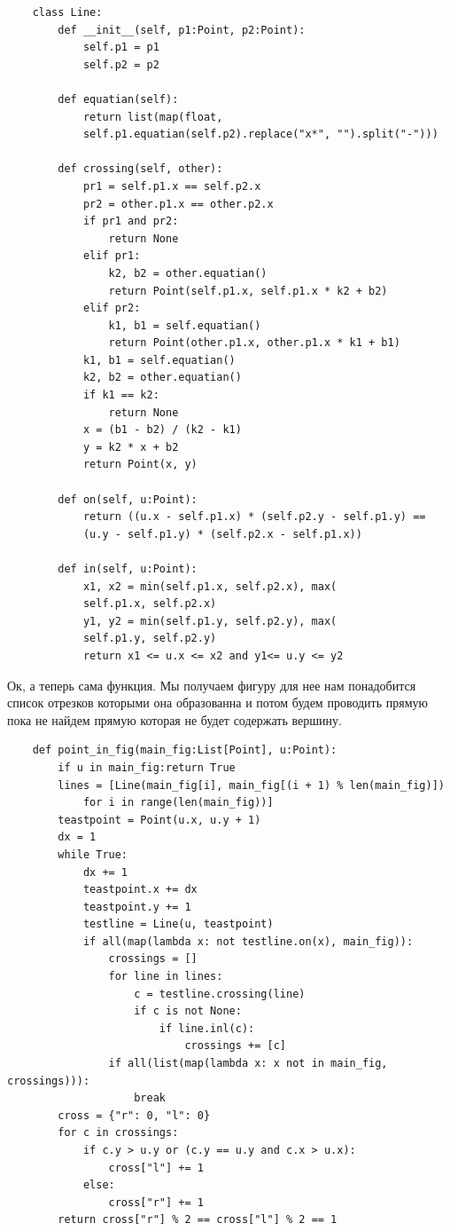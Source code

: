 \documentclass[12pt]{article} %
\begin{document}
 	\begin{verbatim}
 	class Line:
 	    def __init__(self, p1:Point, p2:Point):
 	        self.p1 = p1
 	        self.p2 = p2
 	    
 	    def equatian(self):
 	        return list(map(float, 
 	        self.p1.equatian(self.p2).replace("x*", "").split("-")))
 	    
 	    def crossing(self, other):
 	        pr1 = self.p1.x == self.p2.x
 	        pr2 = other.p1.x == other.p2.x
 	        if pr1 and pr2:
 	            return None
 	        elif pr1:
 	            k2, b2 = other.equatian()
 	            return Point(self.p1.x, self.p1.x * k2 + b2)
 	        elif pr2:
 	            k1, b1 = self.equatian()
 	            return Point(other.p1.x, other.p1.x * k1 + b1)
 	        k1, b1 = self.equatian()
 	        k2, b2 = other.equatian()
 	        if k1 == k2:
 	            return None
 	        x = (b1 - b2) / (k2 - k1)
 	        y = k2 * x + b2
 	        return Point(x, y)
 	    
 	    def on(self, u:Point):
 	        return ((u.x - self.p1.x) * (self.p2.y - self.p1.y) == 
 	        (u.y - self.p1.y) * (self.p2.x - self.p1.x))
 	    
 	    def in(self, u:Point):
 	        x1, x2 = min(self.p1.x, self.p2.x), max(
 	        self.p1.x, self.p2.x)
 	        y1, y2 = min(self.p1.y, self.p2.y), max(
 	        self.p1.y, self.p2.y)
 	        return x1 <= u.x <= x2 and y1<= u.y <= y2
 	\end{verbatim}
 	\hspace*{1cm}Ок, а теперь сама функция. Мы получаем фигуру для нее нам понадобится список отрезков которыми она образованна и потом будем проводить прямую пока не найдем прямую которая не будет содержать вершину.
 	\begin{verbatim}
 	def point_in_fig(main_fig:List[Point], u:Point):
 	    if u in main_fig:return True
 	    lines = [Line(main_fig[i], main_fig[(i + 1) % len(main_fig)])
 	        for i in range(len(main_fig))]
 	    teastpoint = Point(u.x, u.y + 1)
 	    dx = 1
 	    while True:
 	        dx += 1
         	teastpoint.x += dx
         	teastpoint.y += 1
         	testline = Line(u, teastpoint)
         	if all(map(lambda x: not testline.on(x), main_fig)):
             	crossings = []
 	            for line in lines:
 	                c = testline.crossing(line)
 	                if c is not None:
 	                    if line.inl(c):
 	                        crossings += [c]
 	            if all(list(map(lambda x: x not in main_fig, crossings))):
                 	break
 	    cross = {"r": 0, "l": 0}
     	for c in crossings:
         	if c.y > u.y or (c.y == u.y and c.x > u.x):
             	cross["l"] += 1
         	else:
             	cross["r"] += 1
     	return cross["r"] % 2 == cross["l"] % 2 == 1
 	\end{verbatim}
\end{document}
